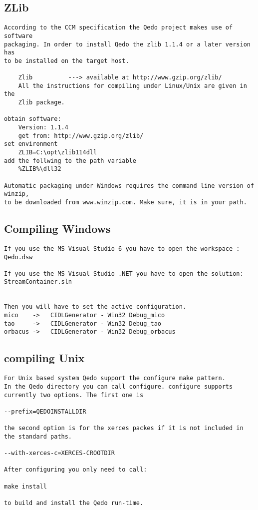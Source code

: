 \documentclass[12pt,a4paper]{report}
\begin{document}
\subsection{ZLib}
\label{sec:ZLib}

\begin{verbatim}
According to the CCM specification the Qedo project makes use of software
packaging. In order to install Qedo the zlib 1.1.4 or a later version has
to be installed on the target host.

	Zlib          ---> available at http://www.gzip.org/zlib/
	All the instructions for compiling under Linux/Unix are given in the
	Zlib package.

obtain software:
	Version: 1.1.4
	get from: http://www.gzip.org/zlib/
set environment
	ZLIB=C:\opt\zlib114dll
add the follwing to the path variable
	%ZLIB%\dll32

Automatic packaging under Windows requires the command line version of winzip,
to be downloaded from www.winzip.com. Make sure, it is in your path.
\end{verbatim}


\subsection{Compiling Windows}
\label{sec:CompilingWindows}

\begin{verbatim}
If you use the MS Visual Studio 6 you have to open the workspace :
Qedo.dsw 

If you use the MS Visual Studio .NET you have to open the solution: 
StreamContainer.sln


Then you will have to set the active configuration. 
mico    ->   CIDLGenerator - Win32 Debug_mico
tao     ->   CIDLGenerator - Win32 Debug_tao
orbacus ->   CIDLGenerator - Win32 Debug_orbacus
\end{verbatim}

\subsection{compiling Unix}
\label{sec:compilingUnix}

\begin{verbatim}
For Unix based system Qedo support the configure make pattern. 
In the Qedo directory you can call configure. configure supports currently two options. The first one is

--prefix=QEDOINSTALLDIR

the second option is for the xerces packes if it is not included in the standard paths.

--with-xerces-c=XERCES-CROOTDIR

After configuring you only need to call:

make install

to build and install the Qedo run-time.

 \end{verbatim}
 
\end{document}
